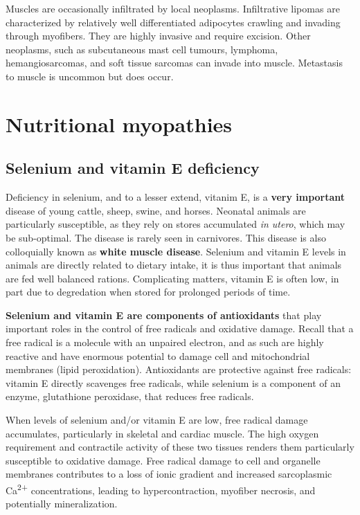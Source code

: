 \documentclass[openany]{book}
\begin{document}
Muscles are occasionally infiltrated by local neoplasms. Infiltrative
lipomas are characterized by relatively well differentiated adipocytes
crawling and invading through myofibers. They are highly invasive and
require excision. Other neoplasms, such as subcutaneous mast cell
tumours, lymphoma, hemangiosarcomas, and soft tissue sarcomas can invade
into muscle. Metastasis to muscle is uncommon but does occur.

\chapter{Nutritional myopathies}\label{nutritional-myopathies}

\hypertarget{selenium-and-vitamin-e-deficiency}{\section{Selenium and
vitamin E deficiency}\label{selenium-and-vitamin-e-deficiency}}

Deficiency in selenium, and to a lesser extend, vitanim E, is a
\textbf{very important} disease of young cattle, sheep, swine, and
horses. Neonatal animals are particularly susceptible, as they rely on
stores accumulated \emph{in utero}, which may be sub-optimal. The
disease is rarely seen in carnivores. This disease is also colloquially
known as \textbf{white muscle disease}. Selenium and vitamin E levels in
animals are directly related to dietary intake, it is thus important
that animals are fed well balanced rations. Complicating matters,
vitamin E is often low, in part due to degredation when stored for
prolonged periods of time.

\textbf{Selenium and vitamin E are components of antioxidants} that play
important roles in the control of free radicals and oxidative damage.
Recall that a free radical is a molecule with an unpaired electron, and
as such are highly reactive and have enormous potential to damage cell
and mitochondrial membranes (lipid peroxidation). Antioxidants are
protective against free radicals: vitamin E directly scavenges free
radicals, while selenium is a component of an enzyme, glutathione
peroxidase, that reduces free radicals.

When levels of selenium and/or vitamin E are low, free radical damage
accumulates, particularly in skeletal and cardiac muscle. The high
oxygen requirement and contractile activity of these two tissues renders
them particularly susceptible to oxidative damage. Free radical damage
to cell and organelle membranes contributes to a loss of ionic gradient
and increased sarcoplasmic Ca\textsuperscript{2+} concentrations,
leading to hypercontraction, myofiber necrosis, and potentially
mineralization.
\end{document}
